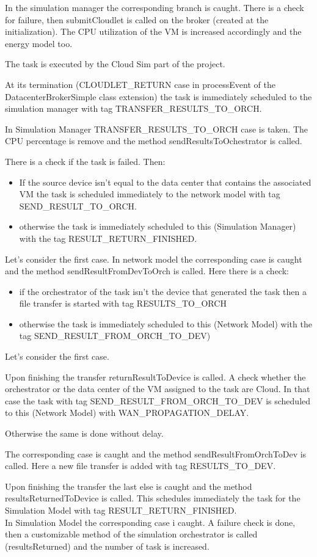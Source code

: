 \documentclass[12pt]{report}
\begin{document}
In the simulation manager the corresponding branch is caught. There is a check for failure, then submitCloudlet is called on the broker (created at the initialization). The CPU utilization of the VM is increased accordingly and the energy model too.

The task is executed by the Cloud Sim part of the project.

At its termination (CLOUDLET\_RETURN case in processEvent of the DatacenterBrokerSimple class extension) the task is immediately scheduled to the simulation manager with tag TRANSFER\_RESULTS\_TO\_ORCH.

In Simulation Manager TRANSFER\_RESULTS\_TO\_ORCH case is taken. The CPU percentage is remove and the method sendResultsToOchestrator is called.

There is a check if the task is failed. Then:
\begin{itemize}
	\item If the source device isn't equal to the data center that contains the associated VM the task is scheduled immediately to the network model with tag SEND\_RESULT\_TO\_ORCH.
	\item otherwise the task is immediately scheduled to this (Simulation Manager) with the tag RESULT\_RETURN\_FINISHED.
\end{itemize}
Let's consider the first case.
In network model the corresponding case is caught and the method sendResultFromDevToOrch is called. Here there is a check:
\begin{itemize}
	\item if the orchestrator of the task isn't the device that generated the task then a file transfer is started with tag RESULTS\_TO\_ORCH
	\item otherwise the task is immediately scheduled to this (Network Model) with the tag SEND\_RESULT\_FROM\_ORCH\_TO\_DEV)
\end{itemize}
Let's consider the first case.

Upon finishing the transfer returnResultToDevice is called.
A check whether the orchestrator or the data center of the VM assigned to the task are Cloud. In that case the task with tag SEND\_RESULT\_FROM\_ORCH\_TO\_DEV is scheduled to this (Network Model) with WAN\_PROPAGATION\_DELAY.

Otherwise the same is done without delay.

The corresponding case is caught and the method sendResultFromOrchToDev is called. Here a new file transfer is added with tag RESULTS\_TO\_DEV.

Upon finishing the transfer the last else is caught and the method \mbox{resultsReturnedToDevice} is called. This schedules immediately the task for the Simulation Model with tag RESULT\_RETURN\_FINISHED.
\\
In Simulation Model the corresponding case i caught. A failure check is done, then a customizable method of the simulation orchestrator is called (resultsReturned) and the number of task is increased.
\end{document}
